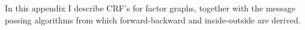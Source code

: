 In this appendix I describe CRF's for factor graphs, together with the message passing algorithms from which forward-backward and inside-outside are derived.
